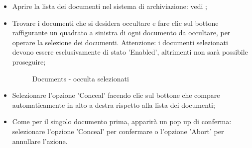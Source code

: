 \documentclass[10pt, a4paper]{article}
\begin{document}
\begin{itemize}
    \item Aprire la lista dei documenti nel sistema di archiviazione: vedi ;
    \item Trovare i documenti che si desidera occultare e fare clic sul bottone raffigurante un quadrato a sinistra di ogni documento da occultare, per operare la selezione dei documenti. Attenzione: i documenti selezionati devono essere esclusivamente di stato 'Enabled', altrimenti non sarà possibile proseguire;
    \begin{figure}[H]
        \centering  
        \caption{Documents - occulta selezionati}
        \label{img:concealSel}
    \end{figure}
    \item Selezionare l'opzione 'Conceal' facendo clic sul bottone che compare automaticamente in alto a destra rispetto alla lista dei documenti; 
    \item Come per il singolo documento prima, apparirà un pop up di conferma: selezionare l'opzione 'Conceal' per confermare o l'opzione 'Abort' per annullare l'azione.
\end{itemize}
\end{document}
